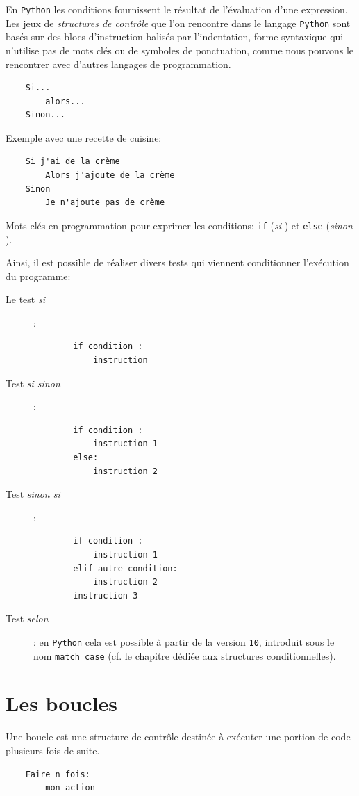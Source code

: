 \documentclass[a4paper,12pt]{book}
\begin{document}
En \texttt{Python} les conditions fournissent le résultat de l'évaluation d'une expression. Les jeux de \textit{structures de contrôle} que l'on rencontre dans le langage \texttt{Python} sont basés sur des blocs d'instruction balisés par l'indentation, forme syntaxique qui n'utilise pas de mots clés ou de symboles de ponctuation, comme nous pouvons le rencontrer avec d'autres langages de programmation.
\begin{verbatim}
    Si...
        alors...
    Sinon...
\end{verbatim}
\medskip

Exemple avec une recette de cuisine:
\begin{verbatim}
    Si j'ai de la crème
        Alors j'ajoute de la crème
    Sinon
        Je n'ajoute pas de crème
\end{verbatim}
\medskip

Mots clés en programmation pour exprimer les conditions: \texttt{if} (\og \textit{si} \fg{})  et \texttt{else} (\og \textit{sinon} \fg{}).
\medskip

Ainsi, il est possible de réaliser divers tests qui viennent conditionner l'exécution du programme:
\begin{description}
	\item[Le test \og \textit{si} \fg{}]:
	\begin{verbatim}
	    if condition : 
	        instruction
	\end{verbatim}
	\item[Test \og \textit{si sinon} \fg{}]:
	\begin{verbatim}
	    if condition : 
	        instruction 1
	    else:
	        instruction 2
	\end{verbatim}
	\item[Test \og \textit{sinon si} \fg{}]:
	\begin{verbatim}
	    if condition : 
	        instruction 1
	    elif autre condition:
	        instruction 2
	    instruction 3
	 \end{verbatim}
	 \item[Test \og \textit{selon} \fg{}]: en \texttt{Python} cela est possible à partir de la version \texttt{10}, introduit sous le nom \texttt{match case} (cf. le chapitre dédiée aux structures conditionnelles).
\end{description} 

\section{Les boucles}
Une boucle est une structure de contrôle destinée à exécuter une portion de code plusieurs fois de suite.
\begin{verbatim}
    Faire n fois:
        mon action
\end{verbatim}
\medskip
\end{document}
